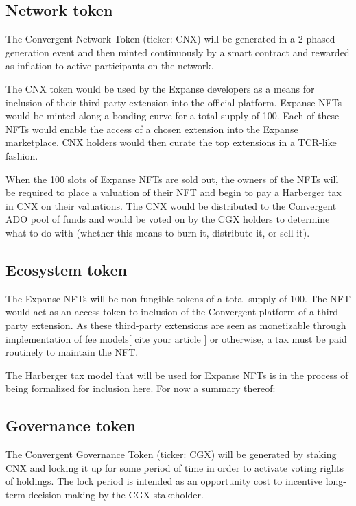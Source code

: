 \documentclass[a4paper, 10pt]{article}
\begin{document}
\subsection{Network token}

The Convergent Network Token (ticker: CNX) will be generated in a 2-phased generation event and then minted continuously by a smart contract and rewarded as inflation to active participants on the network. 

The CNX token would be used by the Expanse developers as a means for inclusion of their third party extension into the official platform. Expanse NFTs would be minted along a bonding curve for a total supply of 100. Each of these NFTs would enable the access of a chosen extension into the Expanse marketplace. CNX holders would then curate the top extensions in a TCR-like fashion. 

When the 100 slots of Expanse NFTs are sold out, the owners of the NFTs will be required to place a valuation of their NFT and begin to pay a Harberger tax in CNX on their valuations. The CNX would be distributed to the Convergent ADO pool of funds and would be voted on by the CGX holders to determine what to do with (whether this means to burn it, distribute it, or sell it). 

\subsection{Ecosystem token}

The Expanse NFTs will be non-fungible tokens of a total supply of 100. The NFT would act as an access token to inclusion of the Convergent platform of a third-party extension. As these third-party extensions are seen as monetizable through implementation of fee models[ cite your article ] or otherwise, a tax must be paid routinely to maintain the NFT.

The Harberger tax model that will be used for Expanse NFTs is in the process of being formalized for inclusion here. For now a summary thereof: 

\subsection{Governance token}

The Convergent Governance Token (ticker: CGX) will be generated by staking CNX and locking it up for some period of time in order to activate voting rights of holdings. The lock period is intended as an opportunity cost to incentive long-term decision making by the CGX stakeholder. 
\end{document}
